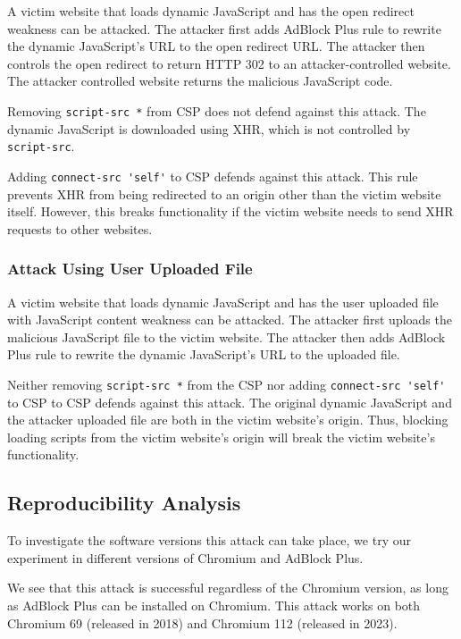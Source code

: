 \documentclass[conference]{IEEEtran}
\begin{document}
A victim website that loads dynamic JavaScript and has the open redirect weakness can be attacked. The attacker first adds AdBlock Plus rule to rewrite the dynamic JavaScript's URL to the open redirect URL. The attacker then controls the open redirect to return HTTP 302 to an attacker-controlled website. The attacker controlled website returns the malicious JavaScript code.

Removing \lstinline{script-src *} from CSP does not defend against this attack. The dynamic JavaScript is downloaded using XHR, which is not controlled by \lstinline{script-src}.

Adding \lstinline{connect-src 'self'} to CSP defends against this attack. This rule prevents XHR from being redirected to an origin other than the victim website itself. However, this breaks functionality if the victim website needs to send XHR requests to other websites.

\subsubsection{Attack Using User Uploaded File}

A victim website that loads dynamic JavaScript and has the user uploaded file with JavaScript content weakness can be attacked. The attacker first uploads the malicious JavaScript file to the victim website. The attacker then adds AdBlock Plus rule to rewrite the dynamic JavaScript's URL to the uploaded file.

Neither removing \lstinline{script-src *} from the CSP nor adding \lstinline{connect-src 'self'} to CSP to CSP defends against this attack. The original dynamic JavaScript and the attacker uploaded file are both in the victim website's origin. Thus, blocking loading scripts from the victim website's origin will break the victim website's functionality.

\subsection{Reproducibility Analysis}

To investigate the software versions this attack can take place, we try our experiment in different versions of Chromium and AdBlock Plus.

We see that this attack is successful regardless of the Chromium version, as long as AdBlock Plus can be installed on Chromium. This attack works on both Chromium 69 (released in 2018) and Chromium 112 (released in 2023).
\end{document}
